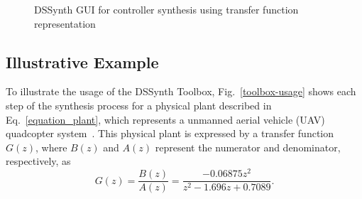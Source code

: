 \documentclass[10pt,conference]{IEEEtran}
\newcommand\tool{{DSSynth Toolbox}\xspace}
\begin{document}
\begin{figure}[ht]
    \centering
		\hfil
		\hfil
		\hfil
		\hfil
    \caption{DSSynth GUI for controller synthesis using transfer function representation}
    \label{fig:gui-for-tf}
\end{figure}

\subsection{Illustrative Example}

To illustrate the usage of the \tool, Fig.~\ref{toolbox-usage} shows each
step of the synthesis process for a physical plant described in
Eq.~\eqref{equation_plant}, which represents a unmanned aerial vehicle
(UAV) quadcopter system~\cite{bouabdallah}.  This physical plant is
expressed by a transfer function $G(z)$, where $B(z)$ and $A(z)$ represent
the numerator and denominator, respectively, as
%
\begin{equation}
\label{equation_plant}
G(z)=\frac{B(z)}{A(z)}=\frac{-0.06875z^{2}}{z^2-1.696z+0.7089}.
\end{equation}
\end{document}
